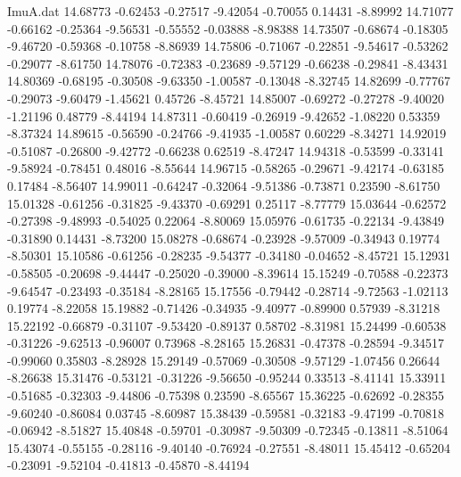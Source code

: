 \begin{filecontents}{ImuA.dat}
  14.68773   -0.62453   -0.27517   -9.42054   -0.70055    0.14431   -8.89992
  14.71077   -0.66162   -0.25364   -9.56531   -0.55552   -0.03888   -8.98388
  14.73507   -0.68674   -0.18305   -9.46720   -0.59368   -0.10758   -8.86939
  14.75806   -0.71067   -0.22851   -9.54617   -0.53262   -0.29077   -8.61750
  14.78076   -0.72383   -0.23689   -9.57129   -0.66238   -0.29841   -8.43431
  14.80369   -0.68195   -0.30508   -9.63350   -1.00587   -0.13048   -8.32745
  14.82699   -0.77767   -0.29073   -9.60479   -1.45621    0.45726   -8.45721
  14.85007   -0.69272   -0.27278   -9.40020   -1.21196    0.48779   -8.44194
  14.87311   -0.60419   -0.26919   -9.42652   -1.08220    0.53359   -8.37324
  14.89615   -0.56590   -0.24766   -9.41935   -1.00587    0.60229   -8.34271
  14.92019   -0.51087   -0.26800   -9.42772   -0.66238    0.62519   -8.47247
  14.94318   -0.53599   -0.33141   -9.58924   -0.78451    0.48016   -8.55644
  14.96715   -0.58265   -0.29671   -9.42174   -0.63185    0.17484   -8.56407
  14.99011   -0.64247   -0.32064   -9.51386   -0.73871    0.23590   -8.61750
  15.01328   -0.61256   -0.31825   -9.43370   -0.69291    0.25117   -8.77779
  15.03644   -0.62572   -0.27398   -9.48993   -0.54025    0.22064   -8.80069
  15.05976   -0.61735   -0.22134   -9.43849   -0.31890    0.14431   -8.73200
  15.08278   -0.68674   -0.23928   -9.57009   -0.34943    0.19774   -8.50301
  15.10586   -0.61256   -0.28235   -9.54377   -0.34180   -0.04652   -8.45721
  15.12931   -0.58505   -0.20698   -9.44447   -0.25020   -0.39000   -8.39614
  15.15249   -0.70588   -0.22373   -9.64547   -0.23493   -0.35184   -8.28165
  15.17556   -0.79442   -0.28714   -9.72563   -1.02113    0.19774   -8.22058
  15.19882   -0.71426   -0.34935   -9.40977   -0.89900    0.57939   -8.31218
  15.22192   -0.66879   -0.31107   -9.53420   -0.89137    0.58702   -8.31981
  15.24499   -0.60538   -0.31226   -9.62513   -0.96007    0.73968   -8.28165
  15.26831   -0.47378   -0.28594   -9.34517   -0.99060    0.35803   -8.28928
  15.29149   -0.57069   -0.30508   -9.57129   -1.07456    0.26644   -8.26638
  15.31476   -0.53121   -0.31226   -9.56650   -0.95244    0.33513   -8.41141
  15.33911   -0.51685   -0.32303   -9.44806   -0.75398    0.23590   -8.65567
  15.36225   -0.62692   -0.28355   -9.60240   -0.86084    0.03745   -8.60987
  15.38439   -0.59581   -0.32183   -9.47199   -0.70818   -0.06942   -8.51827
  15.40848   -0.59701   -0.30987   -9.50309   -0.72345   -0.13811   -8.51064
  15.43074   -0.55155   -0.28116   -9.40140   -0.76924   -0.27551   -8.48011
  15.45412   -0.65204   -0.23091   -9.52104   -0.41813   -0.45870   -8.44194

\end{filecontents}
